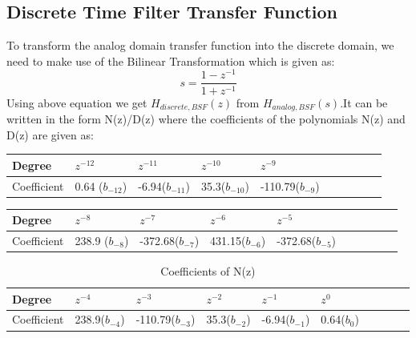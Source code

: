 \documentclass[12pt]{article}
\begin{document}
\subsection{Discrete Time Filter Transfer Function}
To transform the analog domain transfer function into the discrete domain, we need to make use of the Bilinear Transformation which is given as:
\begin{equation*}
s = \frac{1-z^{-1}}{1+z^{-1}}
\end{equation*}
Using above equation we get $H_{discrete,BSF}(z)$ from  $H_{analog,BSF}(s)$.It can be written in the form N(z)/D(z) where the coefficients of the polynomials N(z) and D(z) are given as:\\
\begin{table}[h!]
\centering
\begin{tabular}{|l|l|l|l|l|l|l|l|l|l|}\hline
Degree & $z^{-12}$ & $z^{-11}$ & $z^{-10}$ & $z^{-9}$ \\ \hline
Coefficient &  0.64 ($b_{-12}$) &-6.94($b_{-11}$) & 35.3($b_{-10}$) &-110.79($b_{-9}$) \\\hline
\end{tabular}
\end{table}
\begin{table}[h!]
\centering
\begin{tabular}{|l|l|l|l|l|l|l|l|l|l|}\hline
Degree & $z^{-8}$ & $z^{-7}$ & $z^{-6}$ & $z^{-5}$ \\ \hline
Coefficient & 238.9 ($b_{-8}$) & -372.68($b_{-7}$) &  431.15($b_{-6}$) &-372.68($b_{-5}$) \\\hline
\end{tabular}
\end{table}
\begin{table}[h!]
\centering
\begin{tabular}{|l|l|l|l|l|l|l|l|l|l|}\hline
Degree & $z^{-4}$ & $z^{-3}$ & $z^{-2}$ & $z^{-1}$& $z^{0}$ \\ \hline
Coefficient & 238.9($b_{-4}$) &   -110.79($b_{-3}$) &  35.3($b_{-2}$) & -6.94($b_{-1}$) & 0.64($b_{0}$) \\\hline
\end{tabular}
\caption{\label{tab:widgets}Coefficients of N(z)}
\end{table}

\newpage
\end{document}
